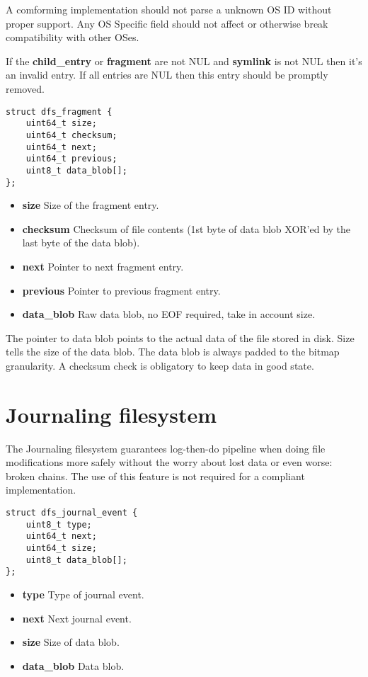 \documentclass[12pt]{article}
\begin{document}
A comforming implementation should not parse a unknown OS ID without proper support. Any OS Specific field should not affect or otherwise break compatibility with other OSes.

If the \textbf{child\_entry} or \textbf{fragment} are not NUL and \textbf{symlink} is not NUL then it's an invalid entry. If all entries are NUL then this entry should be promptly removed.

\begin{verbatim}
struct dfs_fragment {
	uint64_t size;
	uint64_t checksum;
	uint64_t next;
	uint64_t previous;
	uint8_t data_blob[];
};
\end{verbatim}

\begin{itemize}
	\item \textbf{size} Size of the fragment entry.
	\item \textbf{checksum} Checksum of file contents (1st byte of data blob XOR'ed by the last byte of the data blob).
	\item \textbf{next} Pointer to next fragment entry.
	\item \textbf{previous} Pointer to previous fragment entry.
	\item \textbf{data\_blob} Raw data blob, no EOF required, take in account size.
\end{itemize}

The pointer to data blob points to the actual data of the file stored in disk. Size tells the size of the data blob. The data blob is always padded to the bitmap granularity. A checksum check is obligatory to keep data in good state.

\newpage

\section{Journaling filesystem}

The Journaling filesystem guarantees log-then-do pipeline when doing file modifications more safely without the worry about lost data or even worse: broken chains. The use of this feature is not required for a compliant implementation.

\begin{verbatim}
struct dfs_journal_event {
	uint8_t type;
	uint64_t next;
	uint64_t size;
	uint8_t data_blob[];
};
\end{verbatim}

\begin{itemize}
	\item \textbf{type} Type of journal event.
	\item \textbf{next} Next journal event.
	\item \textbf{size} Size of data blob.
	\item \textbf{data\_blob} Data blob.
\end{itemize}
\end{document}
